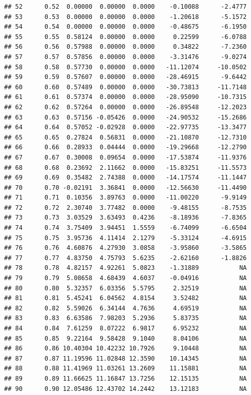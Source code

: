\documentclass{article}\usepackage[]{graphicx}\usepackage[]{color}
\makeatletter
\newenvironment{kframe}{%
 \def\at@end@of@kframe{}%
 \ifinner\ifhmode%
  \def\at@end@of@kframe{\end{minipage}}%
  \begin{minipage}{\columnwidth}%
 \fi\fi%
 \def\FrameCommand##1{\hskip\@totalleftmargin \hskip-\fboxsep
 \colorbox{shadecolor}{##1}\hskip-\fboxsep
     \hskip-\linewidth \hskip-\@totalleftmargin \hskip\columnwidth}%
 \MakeFramed {\advance\hsize-\width
   \@totalleftmargin\z@ \linewidth\hsize
   \@setminipage}}%
 {\par\unskip\endMakeFramed%
 \at@end@of@kframe}
\newenvironment{knitrout}{}{} %
\makeatother
\begin{document}
\begin{knitrout}
\begin{kframe}
\begin{verbatim}
## 52      0.52  0.00000  0.00000  0.0000    -0.10088      -2.4777
## 53      0.53  0.00000  0.00000  0.0000    -1.20618      -5.1572
## 54      0.54  0.00000  0.00000  0.0000    -0.48675      -6.1950
## 55      0.55  0.58124  0.00000  0.0000     0.22599      -6.0788
## 56      0.56  0.57988  0.00000  0.0000     0.34822      -7.2360
## 57      0.57  0.57856  0.00000  0.0000    -3.31476      -9.0274
## 58      0.58  0.57730  0.00000  0.0000   -11.12074     -10.0502
## 59      0.59  0.57607  0.00000  0.0000   -28.46915      -9.6442
## 60      0.60  0.57489  0.00000  0.0000   -30.73813     -11.7148
## 61      0.61  0.57374  0.00000  0.0000   -28.95090     -10.7315
## 62      0.62  0.57264  0.00000  0.0000   -26.89548     -12.2023
## 63      0.63  0.57156 -0.05426  0.0000   -24.90532     -15.2686
## 64      0.64  0.57052 -0.02928  0.0000   -22.97735     -13.3477
## 65      0.65  0.27824  0.56831  0.0000   -21.10870     -12.7310
## 66      0.66  0.28933  0.04444  0.0000   -19.29668     -12.2790
## 67      0.67  0.30008  0.09654  0.0000   -17.53874     -11.9376
## 68      0.68  0.23692  2.11662  0.0000   -15.83251     -11.5573
## 69      0.69  0.35482  2.74388  0.0000   -14.17574     -11.1447
## 70      0.70 -0.02191  3.36841  0.0000   -12.56630     -11.4490
## 71      0.71  0.10356  3.89763  0.0000   -11.00220      -9.9149
## 72      0.72  2.30740  3.77482  0.0000    -9.48155      -8.7535
## 73      0.73  3.03529  3.63493  0.4236    -8.18936      -7.8365
## 74      0.74  3.75409  3.94451  1.5559    -6.74099      -6.6504
## 75      0.75  3.95736  4.11414  2.1279    -5.33124      -4.6915
## 76      0.76  4.60876  4.27930  3.0858    -3.95860      -3.5865
## 77      0.77  4.83750  4.75793  5.6235    -2.62160      -1.8826
## 78      0.78  4.82157  4.92261  5.0823    -1.31889           NA
## 79      0.79  5.08658  4.68439  4.6037    -0.04916           NA
## 80      0.80  5.32357  6.03356  5.5795     2.32519           NA
## 81      0.81  5.45241  6.04562  4.8154     3.52482           NA
## 82      0.82  5.59026  6.34144  4.7636     4.69519           NA
## 83      0.83  6.63586  7.98203  5.2936     5.83735           NA
## 84      0.84  7.61259  8.07222  6.9817     6.95232           NA
## 85      0.85  9.22164  9.58428  9.1040     8.04106           NA
## 86      0.86 10.40304 10.42232 10.7926     9.10448           NA
## 87      0.87 11.19596 11.02848 12.3590    10.14345           NA
## 88      0.88 11.41969 11.03261 13.2609    11.15881           NA
## 89      0.89 11.66625 11.16847 13.7256    12.15135           NA
## 90      0.90 12.05486 12.43702 14.2442    13.12183           NA

\end{verbatim}
\end{kframe}
\end{knitrout}
\end{document}
